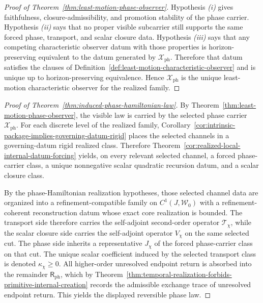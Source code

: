 
\begin{proof}[Proof of Theorem~\ref{thm:least-motion-phase-observer}]
\label{proof:thm:least-motion-phase-observer}
Hypothesis \emph{(i)} gives faithfulness, closure-admissibility, and promotion
stability of the phase carrier. Hypothesis \emph{(ii)} says that no proper
visible subcarrier still supports the same forced phase, transport, and scalar
closure data. Hypothesis \emph{(iii)} says that any competing characteristic
observer datum with those properties is horizon-preserving equivalent to the
datum generated by \(\mathcal X_{\mathrm{ph}}\). Therefore that datum
satisfies the clauses of
Definition~\ref{def:least-motion-characteristic-observer} and is unique up to
horizon-preserving equivalence. Hence \(\mathcal X_{\mathrm{ph}}\) is the
unique least-motion characteristic observer for the realized family.
\end{proof}

\begin{proof}[Proof of Theorem~\ref{thm:induced-phase-hamiltonian-law}]
\label{proof:thm:induced-phase-hamiltonian-law}
By Theorem~\ref{thm:least-motion-phase-observer}, the visible law is carried by
the selected phase carrier \(\mathcal X_{\mathrm{ph}}\). For each discrete
level of the realized family,
Corollary~\ref{cor:intrinsic-package-implies-governing-datum-rigid} places the
selected channels in a governing-datum rigid realized class. Therefore
Theorem~\ref{cor:realized-local-internal-datum-forcing} yields, on every
relevant selected channel, a forced phase-carrier class, a unique nonnegative
scalar quadratic recursion datum, and a scalar closure class.

By the phase-Hamiltonian realization hypotheses, those selected channel data
are organized into a refinement-compatible family on
\(C^1(J,\mathcal W_0)\) with a refinement-coherent reconstruction datum whose
exact core realization is bounded. The transport side therefore carries the
self-adjoint second-order operator \(\mathcal T_{\chi}\), while the scalar
closure side carries the self-adjoint operator \(V_{\chi}\) on the same
selected cut. The phase side inherits a representative \(J_{\chi}\) of the
forced phase-carrier class on that cut. The unique scalar coefficient induced
by the selected transport class is denoted \(\kappa_{\chi}\ge 0\). All
higher-order unresolved endpoint return is absorbed into the remainder
\(\mathsf R_{\mathrm{ph}}\), which by
Theorem~\ref{thm:temporal-realization-forbids-primitive-internal-creation}
records the admissible exchange trace of unresolved endpoint return. This
yields the displayed reversible phase law.
\end{proof}

